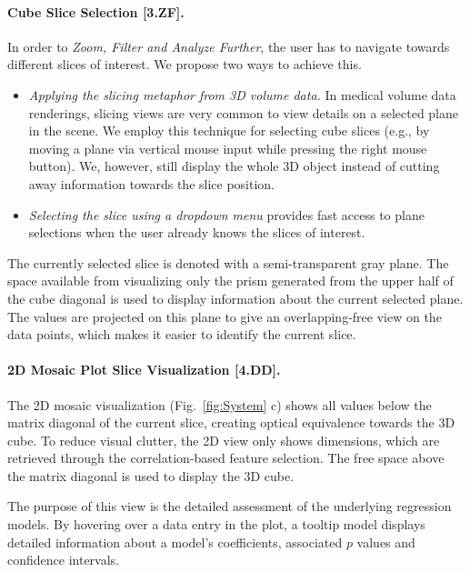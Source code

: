 \documentclass[journal]{style/vgtc} 			          %
\newcommand{\com}[1]{\textcolor{orange}{\uline{#1}}}
\begin{document}
\paragraph{Cube Slice Selection [3.ZF].}
In order to \emph{Zoom, Filter and Analyze Further}, the user has to navigate towards different slices of interest.
We propose two ways to achieve this.
\begin{itemize}
	\item \emph{Applying the slicing metaphor from 3D volume data.}
	In medical volume data renderings, slicing views are very common to view details on a selected plane in the scene.
	We employ this technique for selecting cube slices (e.g., by moving a plane via vertical mouse input while pressing the right mouse button).
	We, however, still display the whole 3D object instead of cutting away information towards the slice position.
	\item \emph{Selecting the slice using a dropdown menu} provides fast access to plane selections when the user already knows the slices of interest.
\end{itemize}
The currently selected slice is denoted with a semi-transparent gray plane.
The space available from visualizing only the prism generated from the upper half of the cube diagonal is used to display information about the current selected plane.
The values are projected on this plane to give an overlapping-free view on the data points, which makes it easier to identify the current slice.
\paragraph{2D Mosaic Plot Slice Visualization [4.DD].}
The 2D mosaic visualization (Fig.~\ref{fig:System} c) shows all values below the matrix diagonal of the current slice, creating optical equivalence towards the 3D cube.
To reduce visual clutter, the 2D view only shows dimensions, which are retrieved through the correlation-based feature selection.
The free space above the matrix diagonal is used to display the 3D cube.

The purpose of this view is the detailed assessment of the underlying regression models.
By hovering over a data entry in the plot, a tooltip model displays detailed information about a model's coefficients, associated $p$ values and confidence intervals.
\end{document}

